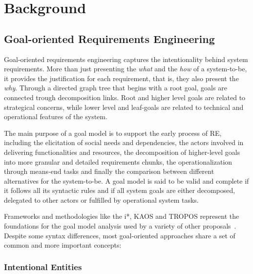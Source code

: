 \chapter{Background}\label{ch:baseline}%

\section{Goal-oriented Requirements Engineering}

Goal-oriented requirements engineering captures the intentionality behind system requirements. More than just presenting the \textit{what} and the \textit{how} of a system-to-be, it provides the justification for each requirement, that is, they also present the \textit{why}. Through a directed graph tree that begins with a root goal, goals are connected trough decomposition links. Root and higher level goals are related to strategical concerns, while lower level and leaf-goals are related to technical and operational features of the system. 

The main purpose of a goal model is to support the early process of RE, including the elicitation of social needs and dependencies, the actors involved in delivering functionalities and resources, the decomposition of higher-level goals into more granular and detailed requirements chunks, the operationalization through means-end tasks and finally the comparison between different alternatives for the system-to-be. A goal model is said to be valid and complete if it follows all its syntactic rules and if all system goals are either decomposed, delegated to other actors or fulfilled by operational system tasks. 

Frameworks and methodologies like the i*, KAOS and TROPOS represent the foundations for the goal model analysis used by a variety of other proposals~\cite{Yu1996, Dardenne1993, Bresciani:2004}. Despite some syntax differences, most goal-oriented approaches share a set of common and more important concepts:
\bigskip


\subsection{Intentional Entities}

